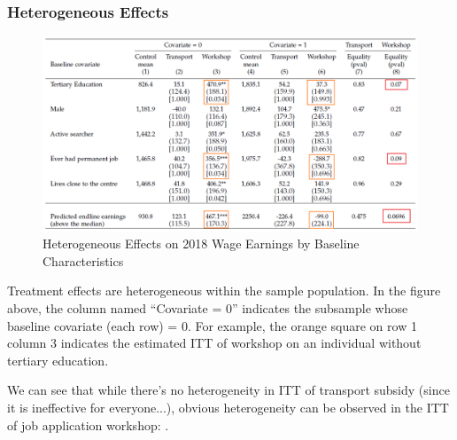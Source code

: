         \subsubsection{Heterogeneous Effects}
            \begin{figure}[H]
                \centering
                \includegraphics[width=5.5in]{images/ch6/Abebe result 6 heterogeneous.png}
                \caption{Heterogeneous Effects on 2018 Wage Earnings by Baseline Characteristics}
            \end{figure}
            Treatment effects are heterogeneous within the sample population. In the figure above, the column named ``Covariate = 0'' indicates the subsample whose baseline covariate (each row) = 0. For example, the orange square on row 1 column 3 indicates the estimated ITT of workshop on an individual without tertiary education.\par
            We can see that while there's no heterogeneity in ITT of transport subsidy (since it is ineffective for everyone...), obvious heterogeneity can be observed in the ITT of job application workshop: .